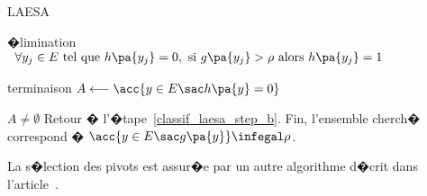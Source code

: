 \begin{xalgorithm}{LAESA}
            
            \begin{xalgostep}{�limination}
                $\begin{array}{rl}
                \forall y_j \in E \text{ tel que } h\pa{y_j} = 0, \text{ si } g\pa{y_j} > \rho \text{ alors }
                h\pa{y_j} = 1
                \end{array}$
            \end{xalgostep}
            
            \begin{xalgostep}{terminaison}
                $A \longleftarrow \acc{ y \in E \sac h\pa{y} = 0 }$ \\
                \begin{xif}{$A \neq \emptyset$}
                Retour � l'�tape~\ref{classif_laesa_step_b}.
                \xelse
                Fin, l'ensemble cherch� correspond � $\acc{y \in E \sac g\pa{y}} \infegal \rho$.
                \end{xif}
            \end{xalgostep}
            
            \end{xalgorithm}




La s�lection des pivots est assur�e par un autre algorithme d�crit dans l'article~.



